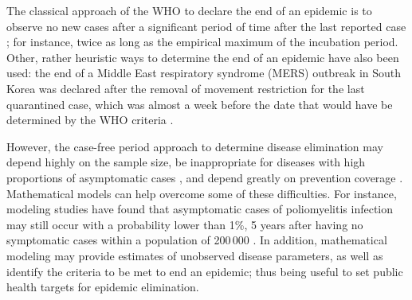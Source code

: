 The classical approach of the WHO to declare the end of an epidemic is to observe no new cases after a significant period of time after the last reported case \cite[]{Nishiura2016}; for instance, twice as long as the empirical maximum of the incubation period. Other, rather heuristic ways to determine the end of an epidemic have also been used: the end of a Middle East respiratory syndrome (MERS) outbreak in South Korea was declared after the removal of movement restriction for the last quarantined case, which was almost a week before the date that would have be determined by the WHO criteria \cite[]{Nishiura2016}. 

However, the case-free period approach to determine disease elimination may depend highly on the sample size, be inappropriate for diseases with high proportions of asymptomatic cases \cite[]{Nishiura2016}, and depend greatly on prevention coverage \cite[]{Eichner1996}. Mathematical models can help overcome some of these difficulties. For instance, modeling studies have found that asymptomatic cases of poliomyelitis infection may still occur with a probability lower than 1\%, 5 years after having no symptomatic cases within a population of 200\,000 \cite[]{Eichner1996}. In addition, mathematical modeling may provide estimates of unobserved disease parameters, as well as identify the criteria to be met to end an epidemic; thus being useful to set public health targets for epidemic elimination.

